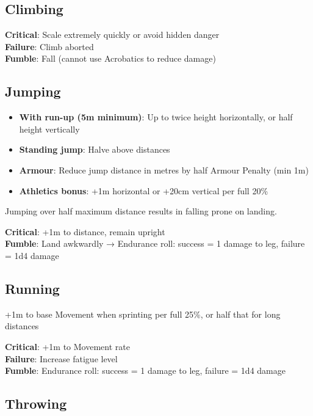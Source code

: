 \documentclass[10pt]{article}
\begin{document}
\subsection{Climbing}
\label{skill:climbing}


\textbf{Critical}: Scale extremely quickly or avoid hidden danger\\
\textbf{Failure}: Climb aborted\\
\textbf{Fumble}: Fall (cannot use Acrobatics to reduce damage)

\subsection{Jumping}
\label{skill:jumping}

\begin{itemize}
    \item \textbf{With run-up (5m minimum)}: Up to twice height horizontally, or half height vertically
    \item \textbf{Standing jump}: Halve above distances
    \item \textbf{Armour}: Reduce jump distance in metres by half Armour Penalty (min 1m)
    \item \textbf{Athletics bonus}: +1m horizontal or +20cm vertical per full 20\%
\end{itemize}

Jumping over half maximum distance results in falling prone on landing.

\textbf{Critical}: +1m to distance, remain upright\\
\textbf{Fumble}: Land awkwardly → Endurance roll: success = 1 damage to leg, failure = 1d4 damage

\subsection{Running}
\label{skill:running}

+1m to base Movement when sprinting per full 25\%, or half that for long distances

\textbf{Critical}: +1m to Movement rate\\
\textbf{Failure}: Increase fatigue level\\
\textbf{Fumble}: Endurance roll: success = 1 damage to leg, failure = 1d4 damage

\subsection{Throwing}
\label{skill:throwing}
\end{document}
